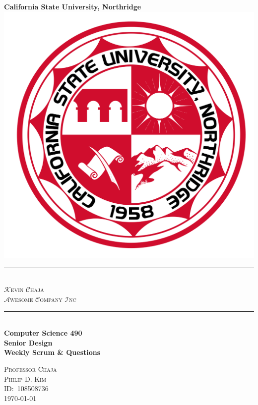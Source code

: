 \begin{titlepage}
  \newcommand{\HRule}{\rule{\linewidth}{0.5mm}}
  \center\Huge\textbf{California State University, Northridge}\\[1cm]
  \includegraphics[scale=0.1]{images/CSUNS.svg.png}\\[1cm]
  \HRule\  \\[0.4cm]
  {\huge\textsc{\(\mathcal{K}\)evin \(\mathcal{C}\)haja\\ \(\mathcal{A}\)wesome \(\mathcal{C}\)ompany \(\mathcal{I}\)nc}\,\texttrademark}\\[0.4cm]
  \HRule\  \\[2.4cm]
  \Large\textbf{Computer Science 490\\Senior Design}\\[0.2cm]
  \normalsize\textbf{Weekly Scrum \& Questions}
  \vfill
  \begin{minipage}{0.4\textwidth}
  \large\centering
  \textsc{Professor Chaja}\\
  \textsc{Philip D. Kim}\\
  \textsc{ID:\ 108508736}\\
  \textsc{\today}
  \end{minipage}
\end{titlepage}